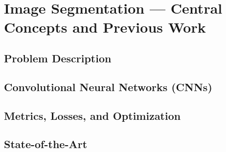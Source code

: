 \section{Image Segmentation --- Central Concepts and Previous Work}


\subsection{Problem Description}%
\label{sec:segmentation-description}


\subsection{Convolutional Neural Networks (CNNs)}%
\label{sec:cnn}
  
  
  
  
  

\subsection{Metrics, Losses, and Optimization}%
\label{sec:segmentation-metrics}

  

  

  

  

\newpage
\subsection{State-of-the-Art}%
\label{sec:state-of-the-art}

